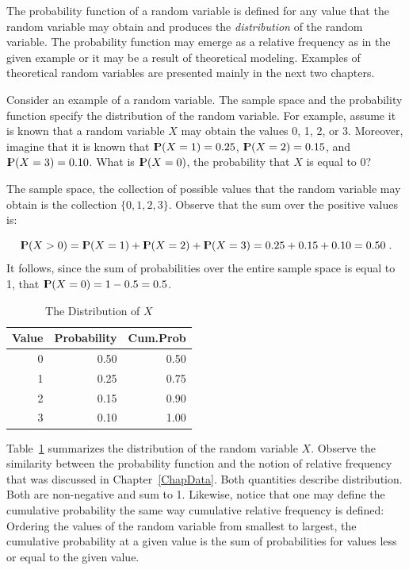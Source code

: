 \documentclass[]{krantz}
\newcommand{\Prob}{{\rm I\kern-.3em P}}
\theoremstyle{definition}
\theoremstyle{definition}
\theoremstyle{definition}
\theoremstyle{remark}
\begin{document}
The probability function of a random variable is defined for any value
that the random variable may obtain and produces the \emph{distribution} of
the random variable. The probability function may emerge as a relative
frequency as in the given example or it may be a result of theoretical
modeling. Examples of theoretical random variables are presented mainly
in the next two chapters.

Consider an example of a random variable. The sample space and the
probability function specify the distribution of the random variable.
For example, assume it is known that a random variable \(X\) may obtain
the values 0, 1, 2, or 3. Moreover, imagine that it is known that
\(\Prob(X=1) = 0.25\), \(\Prob(X=2) = 0.15\), and \(\Prob(X=3)= 0.10\). What
is \(\Prob(X=0)\), the probability that \(X\) is equal to 0?

The sample space, the collection of possible values that the random
variable may obtain is the collection \(\{0,1,2,3\}\). Observe that the
sum over the positive values is:

\[\Prob(X > 0) = \Prob(X=1) + \Prob(X=2) + \Prob(X=3) = 0.25 + 0.15 + 0.10 = 0.50\;.\]
It follows, since the sum of probabilities over the entire sample space
is equal to 1, that \(\Prob(X=0) = 1- 0.5 = 0.5\).

\begin{table}[t]

\caption{\label{tab:Probability1}The Distribution of $X$}
\centering
\begin{tabular}{rrr}
\toprule
Value & Probability & Cum.Prob\\
\midrule
0 & 0.50 & 0.50\\
1 & 0.25 & 0.75\\
2 & 0.15 & 0.90\\
3 & 0.10 & 1.00\\
\bottomrule
\end{tabular}
\end{table}

Table~\ref{tab:Probability1} summarizes the distribution of the random
variable \(X\). Observe the similarity between the probability function
and the notion of relative frequency that was discussed in
Chapter~\ref{ChapData}. Both quantities describe distribution. Both are
non-negative and sum to 1. Likewise, notice that one may define the
cumulative probability the same way cumulative relative frequency is
defined: Ordering the values of the random variable from smallest to
largest, the cumulative probability at a given value is the sum of
probabilities for values less or equal to the given value.
\end{document}
